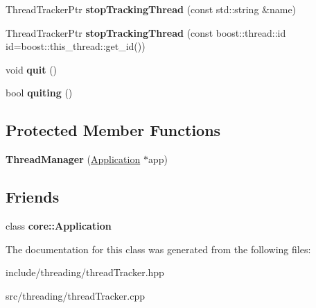 \begin{DoxyCompactItemize}
\item 
\hypertarget{classcore_1_1threading_1_1_thread_manager_ac941d7da7799dbd5ab4abc283b6893ac}{Thread\-Tracker\-Ptr {\bfseries stop\-Tracking\-Thread} (const std\-::string \&name)}\label{classcore_1_1threading_1_1_thread_manager_ac941d7da7799dbd5ab4abc283b6893ac}

\item 
\hypertarget{classcore_1_1threading_1_1_thread_manager_a75a407945912ade81cb879b2601bdf05}{Thread\-Tracker\-Ptr {\bfseries stop\-Tracking\-Thread} (const boost\-::thread\-::id id=boost\-::this\-\_\-thread\-::get\-\_\-id())}\label{classcore_1_1threading_1_1_thread_manager_a75a407945912ade81cb879b2601bdf05}

\item 
\hypertarget{classcore_1_1threading_1_1_thread_manager_aa9b52dc200520f5f0ea088d7942e8d90}{void {\bfseries quit} ()}\label{classcore_1_1threading_1_1_thread_manager_aa9b52dc200520f5f0ea088d7942e8d90}

\item 
\hypertarget{classcore_1_1threading_1_1_thread_manager_acb5eb05e5197fb983f9354ca1f062757}{bool {\bfseries quiting} ()}\label{classcore_1_1threading_1_1_thread_manager_acb5eb05e5197fb983f9354ca1f062757}

\end{DoxyCompactItemize}
\subsection*{Protected Member Functions}
\begin{DoxyCompactItemize}
\item 
\hypertarget{classcore_1_1threading_1_1_thread_manager_a8b821ee5aa8c06fb5c19a8e91f14bf47}{{\bfseries Thread\-Manager} (\hyperlink{classcore_1_1_application}{Application} $\ast$app)}\label{classcore_1_1threading_1_1_thread_manager_a8b821ee5aa8c06fb5c19a8e91f14bf47}

\end{DoxyCompactItemize}
\subsection*{Friends}
\begin{DoxyCompactItemize}
\item 
\hypertarget{classcore_1_1threading_1_1_thread_manager_a0818553b329f99d15d5e373e903a9f54}{class {\bfseries core\-::\-Application}}\label{classcore_1_1threading_1_1_thread_manager_a0818553b329f99d15d5e373e903a9f54}

\end{DoxyCompactItemize}


The documentation for this class was generated from the following files\-:\begin{DoxyCompactItemize}
\item 
include/threading/thread\-Tracker.\-hpp\item 
src/threading/thread\-Tracker.\-cpp\end{DoxyCompactItemize}
